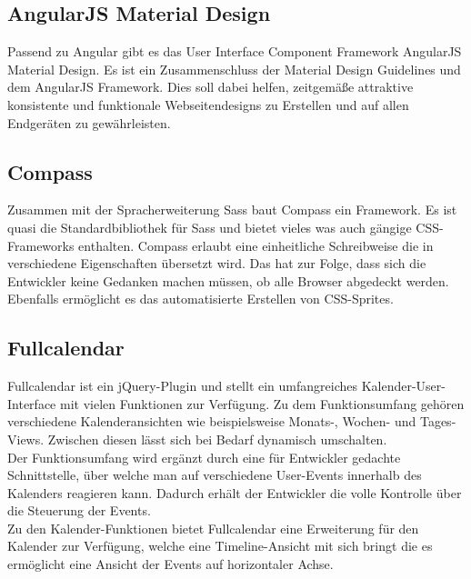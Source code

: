 \subsection{AngularJS Material Design}
Passend zu Angular gibt es das User Interface Component Framework AngularJS Material Design. Es ist ein Zusammenschluss der Material Design Guidelines und dem AngularJS Framework. Dies soll dabei helfen, zeitgemäße attraktive konsistente und funktionale  Webseitendesigns zu Erstellen und auf allen Endgeräten zu gewährleisten.

\subsection{Compass}
Zusammen mit der Spracherweiterung Sass baut Compass ein Framework. Es ist quasi die Standardbibliothek für Sass und bietet vieles was auch gängige CSS-Frameworks enthalten. Compass erlaubt eine einheitliche Schreibweise die in verschiedene Eigenschaften übersetzt wird. Das hat zur Folge, dass sich die Entwickler keine Gedanken machen müssen, ob alle Browser abgedeckt werden. Ebenfalls ermöglicht es das automatisierte Erstellen von CSS-Sprites. 

\subsection{Fullcalendar}
Fullcalendar ist ein jQuery-Plugin und stellt ein umfangreiches Kalender-User-Interface mit vielen Funktionen zur Verfügung. Zu dem Funktionsumfang gehören verschiedene Kalenderansichten wie beispielsweise Monats-, Wochen- und Tages-Views. Zwischen diesen lässt sich bei Bedarf dynamisch umschalten.\\
Der Funktionsumfang wird ergänzt durch eine für Entwickler gedachte Schnittstelle, über welche man auf verschiedene User-Events innerhalb des Kalenders reagieren kann. Dadurch erhält der Entwickler die volle Kontrolle über die Steuerung der Events.\\
Zu den Kalender-Funktionen bietet Fullcalendar eine Erweiterung für den Kalender zur Verfügung, welche eine Timeline-Ansicht mit sich bringt die es ermöglicht eine Ansicht der Events auf horizontaler Achse.

